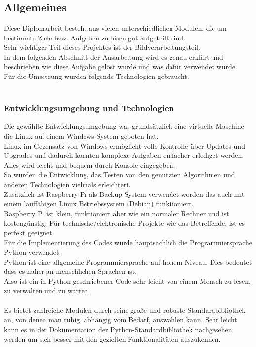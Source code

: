 \chapter{\docname}
\label{\docname}

\section{Allgemeines}


Diese Diplomarbeit besteht aus vielen unterschiedlichen Modulen, die um bestimmte Ziele bzw. Aufgaben zu lösen gut aufgeteilt sind.\\
Sehr wichtiger Teil dieses Projektes ist der Bildverarbeitungsteil.\\
In dem folgenden Abschnitt der Ausarbeitung wird es genau erklärt und beschrieben wie diese Aufgabe gelöst wurde und was dafür verwendet wurde.\\ 
Für die Umsetzung wurden folgende Technologien gebraucht. \\
\\
\subsection{Entwicklungsumgebung und Technologien}

Die gewählte Entwicklungsumgebung war grundsätzlich eine virtuelle Maschine die Linux auf einem Windows System geboten hat. \\
Linux im Gegensatz von Windows ermöglicht volle Kontrolle über Updates und Upgrades und dadurch könnten komplexe Aufgaben einfacher erlediget werden.\\ Alles wird leicht und bequem durch Konsole eingegeben. \\
So wurden die Entwicklung, das Testen von den genutzten Algorithmen und anderen Technologien vielmals erleichtert. \cite{linx}\\

Zusätzlich ist Raspberry Pi als Backup System verwendet worden das auch mit einem lauffähigen Linux Betriebssystem (Debian) funktioniert. \\
Raspberry Pi ist klein, funktioniert aber wie ein normaler Rechner und ist  kostengünstig. Für technische/elektronische Projekte wie das Betreffende, ist es perfekt geeignet. \\ 
Für die Implementierung des Codes wurde hauptsächlich die Programmiersprache Python verwendet. \\
Python ist eine allgemeine Programmiersprache auf hohem Niveau. Dies bedeutet dass es näher an menschlichen Sprachen ist. \\
Also ist ein in Python geschriebener Code sehr leicht von einem Mensch zu lesen, zu verwalten und zu warten.  \\ 
\\
Es bietet zahlreiche Modulen durch seine große und robuste Standardbibliothek an, von denen man ruhig, abhängig vom Bedarf, auswählen kann.  
Sehr leicht kann es in der Dokumentation der Python-Standardbibliothek nachgesehen werden um sich besser mit den gezielten Funktionalitäten auszukennen. \\ \cite{why_python}

